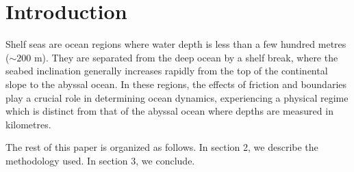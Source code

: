 \section{\Large{Introduction}}
Shelf seas are ocean regions where water depth is less than a few hundred metres ($\sim 200$ m). They are separated from the deep ocean by a shelf break, where the seabed inclination generally increases rapidly from the top of the continental slope to the abyssal ocean. In these regions, the effects of friction and boundaries play a crucial role in determining ocean dynamics, experiencing a
physical regime which is distinct from that of the abyssal ocean where depths are measured in kilometres. 

The rest of this paper is organized as follows. In section 2, we
describe the methodology used. In section 3, we conclude.

